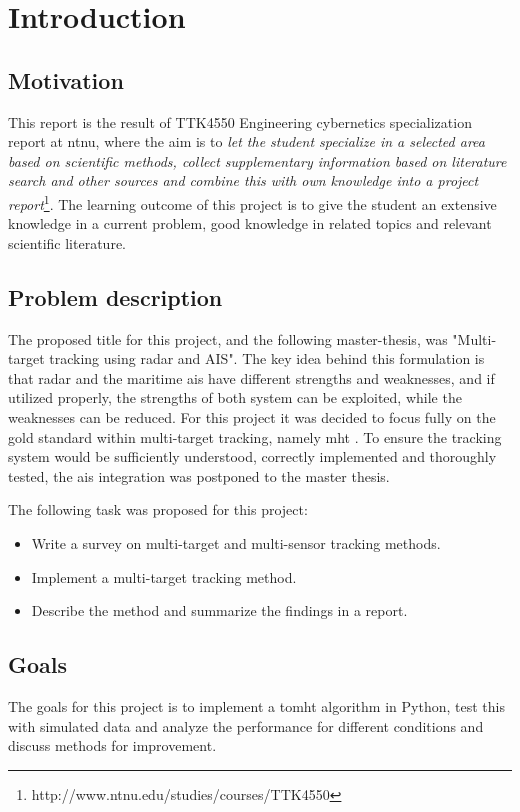 \section{Introduction}
\subsection{Motivation}
This report is the result of TTK4550 Engineering cybernetics specialization report at \gls{ntnu}, where the aim is to \emph{let the student specialize in a selected area based on scientific methods, collect supplementary information based on literature search and other sources and combine this with own knowledge into a project report}\footnote{http://www.ntnu.edu/studies/courses/TTK4550}. The learning outcome of this project is to give the student an extensive knowledge in a current problem, good knowledge in related topics and relevant scientific literature.

\subsection{Problem description}
The proposed title for this project, and the following master-thesis, was "Multi-target tracking using \gls{radar} and AIS". The key idea behind this formulation is that \gls{radar} and the maritime \gls{ais} have different strengths and weaknesses, and if utilized properly, the strengths of both system can be exploited, while the weaknesses can be reduced. For this project it was decided to focus fully on the gold standard within multi-target tracking, namely \gls{mht} . To ensure the tracking system would be sufficiently understood, correctly implemented and thoroughly tested, the \gls{ais} integration was postponed to the master thesis.

The following task was proposed for this project:
\begin{itemize}
\item Write a survey on multi-target and multi-sensor tracking methods.
\item Implement a multi-target tracking method.
\item Describe the method and summarize the findings in a report.
\end{itemize}

\subsection{Goals}
The goals for this project is to implement a \gls{tomht} algorithm in Python, test this with simulated data and analyze the performance for different conditions and discuss methods for improvement.

